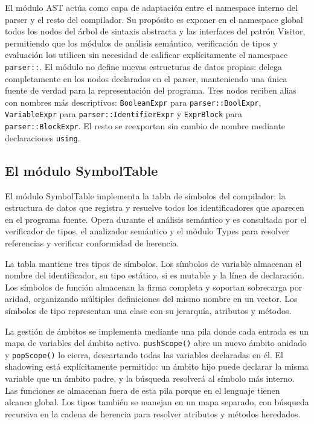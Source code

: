 \documentclass[11pt,a4paper]{article}
\begin{document}
El módulo AST actúa como capa de adaptación entre el namespace interno del parser y el resto del compilador. Su propósito es exponer en el namespace global todos los nodos del árbol de sintaxis abstracta y las interfaces del patrón Visitor, permitiendo que los módulos de análisis semántico, verificación de tipos y evaluación los utilicen sin necesidad de calificar explícitamente el namespace \texttt{parser::}. El módulo no define nuevas estructuras de datos propias: delega completamente en los nodos declarados en el parser, manteniendo una única fuente de verdad para la representación del programa. Tres nodos reciben alias con nombres más descriptivos: \texttt{BooleanExpr} para \texttt{parser::BoolExpr}, \texttt{VariableExpr} para \texttt{parser::IdentifierExpr} y \texttt{ExprBlock} para \texttt{parser::BlockExpr}. El resto se reexportan sin cambio de nombre mediante declaraciones \texttt{using}.

\subsection{El módulo SymbolTable}

El módulo SymbolTable implementa la tabla de símbolos del compilador: la estructura de datos que registra y resuelve todos los identificadores que aparecen en el programa fuente. Opera durante el análisis semántico y es consultada por el verificador de tipos, el analizador semántico y el módulo Types para resolver referencias y verificar conformidad de herencia.

La tabla mantiene tres tipos de símbolos. Los símbolos de variable almacenan el nombre del identificador, su tipo estático, si es mutable y la línea de declaración. Los símbolos de función almacenan la firma completa y soportan sobrecarga por aridad, organizando múltiples definiciones del mismo nombre en un vector. Los símbolos de tipo representan una clase con su jerarquía, atributos y métodos.

La gestión de ámbitos se implementa mediante una pila donde cada entrada es un mapa de variables del ámbito activo. \texttt{pushScope()} abre un nuevo ámbito anidado y \texttt{popScope()} lo cierra, descartando todas las variables declaradas en él. El shadowing está explícitamente permitido: un ámbito hijo puede declarar la misma variable que un ámbito padre, y la búsqueda resolverá al símbolo más interno. Las funciones se almacenan fuera de esta pila porque en el lenguaje tienen alcance global. Los tipos también se manejan en un mapa separado, con búsqueda recursiva en la cadena de herencia para resolver atributos y métodos heredados.
\end{document}
